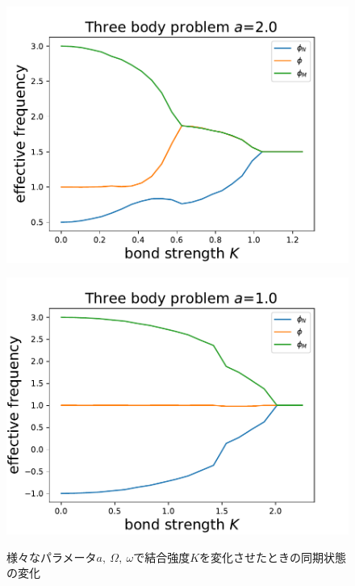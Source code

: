 \documentclass[../main]{subfiles}
\begin{document}
\begin{figure}[t]
\begin{minipage}[b]{0.47\linewidth}
      \label{fig:3body-notapprox175}
    \end{minipage}\\
    \begin{minipage}[b]{0.47\linewidth}
      \centering
      \includegraphics[keepaspectratio, scale=0.42]{images/three-body-prob-notapprox-a200.pdf}
      \label{fig:3body-notapprox200}
    \end{minipage}
    \begin{minipage}[b]{0.47\linewidth}
      \centering
      \includegraphics[keepaspectratio, scale=0.42]{images/three-body-prob-symmetry-a100.pdf}
      \label{fig:3body-symmetry}
    \end{minipage}
    \caption{様々なパラメータ$a,\ \Omega,\ \omega$で結合強度$K$を変化させたときの同期状態の変化}
    \label{fig:3body-abs}
\end{figure}
\end{document}
